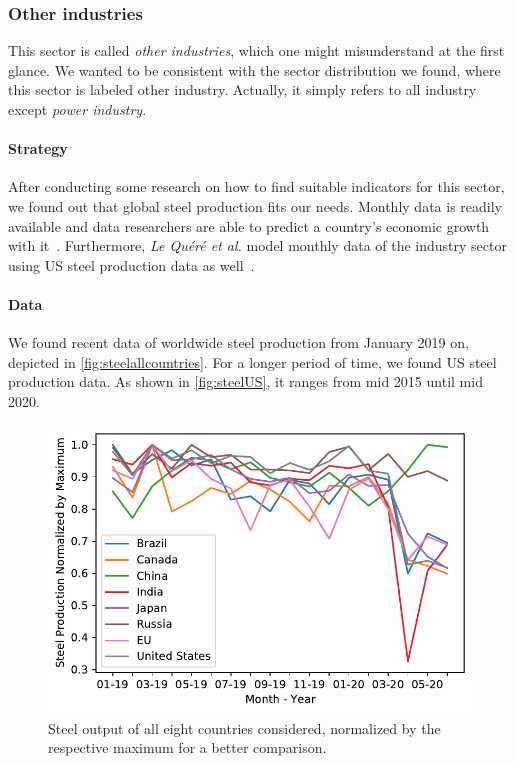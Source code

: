 \subsubsection{Other industries}

This sector is called \textit{other industries}, which one might misunderstand at the first glance. We wanted to be consistent with the sector distribution we found, where this sector is labeled other industry. Actually, it simply refers to all industry except \textit{power industry}.

\paragraph{Strategy}
After conducting some research on how to find suitable indicators for this sector, we found out that global steel production fits our needs. Monthly data is readily available and data researchers are able to predict a country's economic growth with it~\cite{Ravazzolo2020}.
Furthermore, \textit{Le Quéré et al.} model monthly \co data of the industry sector using US steel production data as well~\cite{LeQuere2020}.

\paragraph{Data}
We found recent data of worldwide steel production from January 2019 on, depicted in \autoref{fig:steelallcountries}.
For a longer period of time, we found US steel production data. As shown in \autoref{fig:steelUS}, it ranges from mid 2015 until mid 2020.
\begin{figure}[hbt]
	\centering
	\includegraphics[width=0.69\linewidth]{../predictions/steelAllCountries.pdf}
	\caption{Steel output of all eight countries considered, normalized by the respective maximum for a better comparison.}
	\label{fig:steelallcountries}
\end{figure}

